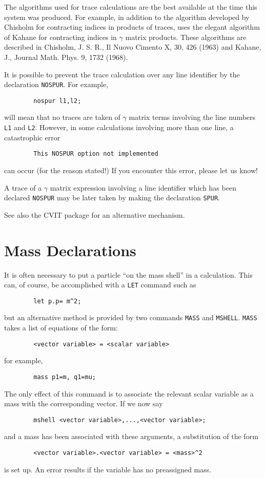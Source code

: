 The algorithms used for trace calculations are the best available at the
time this system was produced. For example, in addition to the algorithm
developed by Chisholm for contracting indices in products of traces,
{\REDUCE} uses the elegant algorithm of Kahane for contracting indices in
$\gamma$ matrix products.  These algorithms are described in Chisholm, J. S.
R., Il Nuovo Cimento X, 30, 426 (1963) and Kahane, J., Journal Math.
Phys. 9, 1732 (1968).

It is possible to prevent the trace calculation over any line identifier
by the declaration {\tt NOSPUR}.  For example,
\begin{verbatim}
        nospur l1,l2;
\end{verbatim}
will mean that no traces are taken of $\gamma$ matrix terms involving the line
numbers {\tt L1} and {\tt L2}.  However, in some calculations involving
more than one line, a catastrophic error
\begin{verbatim}
        This NOSPUR option not implemented
\end{verbatim}
can occur (for the reason stated!) If you encounter this error, please let
us know!

A trace of a $\gamma$ matrix expression involving a line identifier which has
been declared {\tt NOSPUR} may be later taken by making the declaration
{\tt SPUR}.

See also the CVIT package for an alternative
mechanism.

\section{Mass Declarations}

It is often necessary to put a particle ``on the mass shell'' in a
calculation.  This can, of course, be accomplished with a {\tt LET}
command such as
\begin{verbatim}
        let p.p= m^2;
\end{verbatim}
but an alternative method is provided by two commands {\tt MASS} and
{\tt MSHELL}.
{\tt MASS} takes a list of equations of the form:
\begin{verbatim}
        <vector variable> = <scalar variable>
\end{verbatim}
for example,
\begin{verbatim}
        mass p1=m, q1=mu;
\end{verbatim}
The only effect of this command is to associate the relevant scalar
variable as a mass with the corresponding vector. If we now say
\begin{verbatim}
        mshell <vector variable>,...,<vector variable>;
\end{verbatim}
and a mass has been associated with these arguments, a substitution of the
form
\begin{verbatim}
        <vector variable>.<vector variable> = <mass>^2
\end{verbatim}
is set up. An error results if the variable has no preassigned mass.

